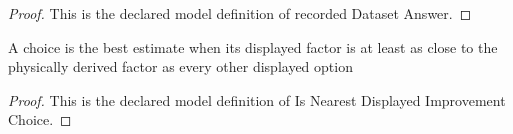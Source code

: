 \begin{proof}
  This is the declared model definition of recorded Dataset Answer.
\end{proof}
\begin{definition}
  \label{def:physics:phyx-mini-0131:phyxminiproblems-problemphyxmini0131-isnearestdisplayedimprovementchoice}
  A choice is the best estimate when its displayed factor is at least as close to the physically derived factor as every other displayed option
\end{definition}
\begin{proof}
  This is the declared model definition of Is Nearest Displayed Improvement Choice.
\end{proof}
